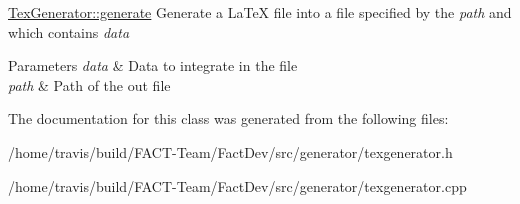 \hyperlink{classGenerator_1_1TexGenerator_a5862fde82e703176d1cdaa33d3ac3db5}{Tex\-Generator\-::generate} Generate a La\-Te\-X file into a file specified by the {\itshape path} and which contains {\itshape data} 


\begin{DoxyParams}{Parameters}
{\em data} & Data to integrate in the file \\
\hline
{\em path} & Path of the out file \\
\hline
\end{DoxyParams}


The documentation for this class was generated from the following files\-:\begin{DoxyCompactItemize}
\item 
/home/travis/build/\-F\-A\-C\-T-\/\-Team/\-Fact\-Dev/src/generator/texgenerator.\-h\item 
/home/travis/build/\-F\-A\-C\-T-\/\-Team/\-Fact\-Dev/src/generator/texgenerator.\-cpp\end{DoxyCompactItemize}
